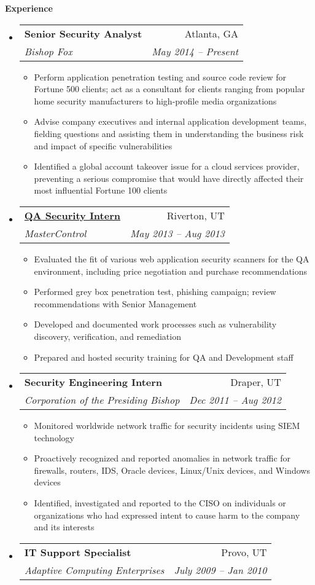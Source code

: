 \documentclass[letterpaper,11pt]{article}
\makeatletter
\newcommand{\resitem}[1]{\item #1 \vspace{-2pt}}
\newcommand{\resheading}[1]{{\large \colorbox{mygrey}{\begin{minipage}{\textwidth}{\textbf{#1 \vphantom{p\^{E}}}}\end{minipage}}}}
\newcommand{\ressubheading}[4]{
\begin{tabular*}{6.5in}{l@{\extracolsep{\fill}}r}
		\textbf{#1} & #2 \\
		\textit{#3} & \textit{#4} \\
\end{tabular*}\vspace{-6pt}}
\makeatother
\begin{document}
\resheading{Experience}
	\begin{itemize}
	\item
			\ressubheading{Senior Security Analyst}{Atlanta, GA}{Bishop Fox}{May 2014 -- Present}
			{ \footnotesize
			\begin{itemize}
				\resitem{Perform application penetration testing and source code review for Fortune 500 clients; act as a consultant for clients ranging from popular home security manufacturers to high-profile media organizations}
				\resitem{Advise company executives and internal application development teams, fielding questions and assisting them in understanding the business risk and impact of specific vulnerabilities}
				\resitem{Identified a global account takeover issue for a cloud services provider, preventing a serious compromise that would have directly affected their most influential Fortune 100 clients}
			\end{itemize}
			}
		\item 
			\ressubheading{\href{}{QA Security Intern}}{Riverton, UT}{MasterControl}{May 2013 -- Aug 2013}
				{ \footnotesize
				\begin{itemize}
					\resitem{Evaluated the fit of various web application security scanners for the QA environment, including price negotiation and purchase recommendations}
					\resitem{Performed grey box penetration test, phishing campaign; review recommendations with Senior Management}
					\resitem{Developed and documented work processes such as vulnerability discovery, verification, and remediation}
					\resitem{Prepared and hosted security training for QA and Development staff}
				\end{itemize}
				}
		\item			
			\ressubheading{Security Engineering Intern}{Draper, UT}{Corporation of the Presiding Bishop}{Dec 2011 -- Aug 2012}
				{ \footnotesize				
				\begin{itemize}
					\resitem{Monitored worldwide network traffic for security incidents using SIEM technology}
					\resitem{Proactively recognized and reported anomalies in network traffic for firewalls, routers, IDS, Oracle devices, Linux/Unix devices, and Windows devices}
					\resitem{Identified, investigated and reported to the CISO on individuals or organizations who had expressed intent to cause harm to the company and its interests}
				\end{itemize}
				}
		\item 
			\ressubheading{IT Support Specialist}{Provo, UT}{Adaptive Computing Enterprises}{July 2009 -- Jan 2010}

\end{itemize}
\end{document}
